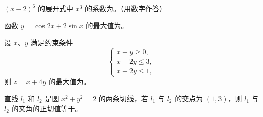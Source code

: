 \begin{question}
$(x-2)^6$ 的展开式中 $x^3$ 的系数为\gkblank{}。（用数字作答）

\end{question}
\begin{question}
函数 $y=\cos2x+2\sin x$ 的最大值为\gkblank{}。

\end{question}
\begin{question}
设 $x$、$y$ 满足约束条件
\nopagebreak[4]
\[\begin{cases}
x-y\geqslant 0,\\
x+2y\leqslant 3,\\
x-2y\leqslant 1,
\end{cases}\]
则 $z=x+4y$ 的最大值为\gkblank{}。

\end{question}
\begin{question}
直线 $l_1$ 和 $l_2$ 是圆 $x^2+y^2=2$ 的两条切线，若 $l_1$ 与 $l_2$ 的交点为 $(1,3)$，则 $l_1$ 与 $l_2$ 的夹角的正切值等于\gkblank{}。

\end{question}

